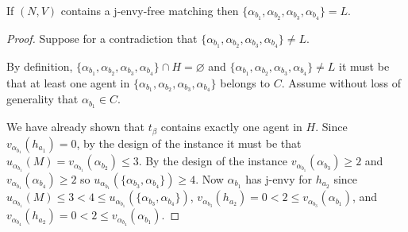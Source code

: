 \begin{lem}
\label{lem:threed_efr_as_jef_lequalsthefourisolated}
If $(N, V)$ contains a j-envy-free matching then $\{ \alpha_{b_1}, \alpha_{b_2}, \alpha_{b_3}, \alpha_{b_4} \} = L$.
\end{lem}
\begin{proof}
Suppose for a contradiction that $\{ \alpha_{b_1}, \alpha_{b_2}, \alpha_{b_3}, \alpha_{b_4} \} \neq L$.

By definition, $\{ \alpha_{b_1}, \alpha_{b_2}, \alpha_{b_3}, \alpha_{b_4} \} \cap H = \varnothing$ and $\{ \alpha_{b_1}, \alpha_{b_2}, \alpha_{b_3}, \alpha_{b_4} \} \neq L$ it must be that at least one agent in $\{ \alpha_{b_1}, \alpha_{b_2}, \alpha_{b_3}, \alpha_{b_4} \}$ belongs to $C$. Assume without loss of generality that $\alpha_{b_1} \in C$.

We have already shown that $t_{\beta}$ contains exactly one agent in $H$. Since $v_{\alpha_{b_1}}(h_{a_1}) = 0$, by the design of the instance it must be that $u_{\alpha_{b_1}}(M) = v_{\alpha_{b_1}}(\alpha_{b_2}) \leq 3$. By the design of the instance $v_{\alpha_{b_1}}(\alpha_{b_3}) \geq 2$ and $v_{\alpha_{b_1}}(\alpha_{b_4}) \geq 2$ so $u_{\alpha_{b_1}}(\{ \alpha_{b_3}, \alpha_{b_4} \}) \geq 4$. Now $\alpha_{b_1}$ has j-envy for $h_{a_2}$ since $u_{\alpha_{b_1}}(M) \leq 3 < 4 \leq u_{\alpha_{b_1}}(\{ \alpha_{b_3}, \alpha_{b_4} \})$, $v_{\alpha_{b_3}}(h_{a_2}) = 0 < 2 \leq v_{\alpha_{b_3}}(\alpha_{b_1})$, and $v_{\alpha_{b_4}}(h_{a_2}) = 0 < 2 \leq v_{\alpha_{b_4}}(\alpha_{b_1})$.
\end{proof}

